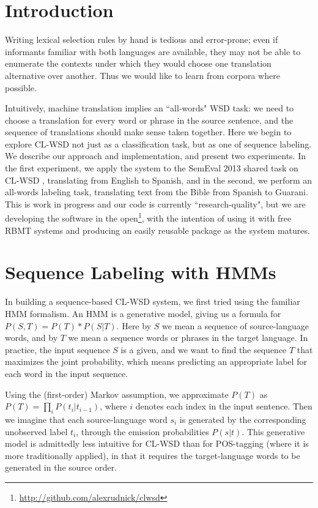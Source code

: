 \lstset{
language=Python,
basicstyle=\small\sffamily,
numbers=none,
numberstyle=\tiny,
frame=tb,
columns=fullflexible,
showstringspaces=false
}


\section{Introduction}

Writing lexical selection rules by hand is tedious and error-prone; even if
informants familiar with both languages are available, they may not be able to
enumerate the contexts under which they would choose one translation
alternative over another. Thus we would like to learn from corpora where
possible. 





Intuitively, machine translation implies an ``all-words" WSD task: we need to
choose a translation for every word or phrase in the source sentence, and the
sequence of translations should make sense taken together. Here we begin to
explore CL-WSD not just as a classification task, but as one of sequence
labeling. We describe our approach and implementation, and present two
experiments. In the first experiment, we apply the system to the SemEval 2013
shared task on CL-WSD \cite{task10}, translating from English to Spanish, and
in the second, we perform an all-words labeling task, translating text from the
Bible from Spanish to Guarani. This is work in progress and our code is
currently ``research-quality", but we are developing the software in the
open\footnote{\url{http://github.com/alexrudnick/clwsd}}, with the intention of
using it with free RBMT systems and producing an easily reusable package as the
system matures.


\section{Sequence Labeling with HMMs}
In building a sequence-based CL-WSD system, we first tried using the familiar
HMM formalism. An HMM is a generative model, giving us a formula for $P(S, T) =
P(T) * P(S|T)$. Here by $S$ we mean a sequence of source-language words, and by
$T$ we mean a sequence words or phrases in the target language. In practice,
the input sequence $S$ is a given, and we want to find the sequence $T$ that
maximizes the joint probability, which means predicting an appropriate label
for each word in the input sequence.

Using the (first-order) Markov assumption, we approximate $P(T)$ as $P(T) =
\prod_{i} P(t_i | t_{i-1})$, where $i$ denotes each index in the input
sentence. Then we imagine that each source-language word $s_i$ is generated by
the corresponding unobserved label $t_i$, through the emission probabilities
$P(s|t)$. This generative model is admittedly less intuitive for CL-WSD than
for POS-tagging (where it is more traditionally applied), in that it requires
the target-language words to be generated in the source order.

